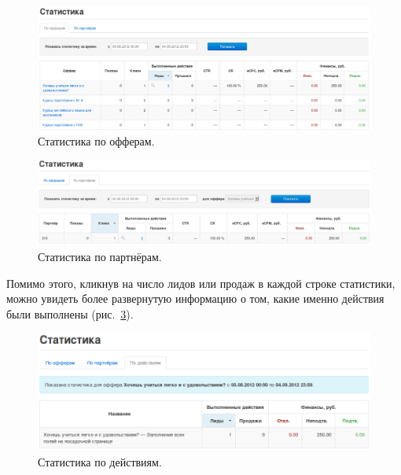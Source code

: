 \documentclass[a4paper,12pt]{article}
\begin{document}
\begin{figure}[!ht]
\centering
\includegraphics[width=\textwidth]{include/stats-offer.png}
\caption{Статистика по офферам.}
\label{fig:stats-offer}
\end{figure}

\begin{figure}[!ht]
\centering
\includegraphics[width=\textwidth]{include/stats-aff.png}
\caption{Статистика по партнёрам.}
\label{fig:stats-aff}
\end{figure}

Помимо этого, кликнув на число лидов или продаж в каждой строке статистики, можно увидеть более развернутую информацию о том, какие именно действия были выполнены (рис.~\ref{fig:stats-suboffer}).

\begin{figure}[!ht]
\centering
\includegraphics[width=\textwidth]{include/stats-suboffer.png}
\caption{Статистика по действиям.}
\label{fig:stats-suboffer}
\end{figure}
\end{document}
